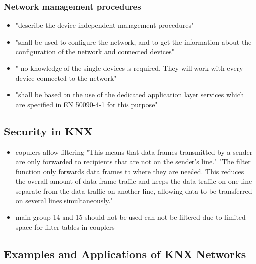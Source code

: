 \subsubsection{Network management procedures}
	\begin{itemize}
		\item "describe the device independent management procedures" \parencite{DIN_EN_50090-7-1}
		\item "shall be used to configure the network, and to get the information about the configuration of the network and connected devices" \parencite{DIN_EN_50090-7-1}
		\item " no knowledge of the single devices is required. They will work with every device connected to the network" \parencite{DIN_EN_50090-7-1}
		\item "shall be based on the use of the dedicated application layer services which are specified in EN 50090-4-1 \parencite{DIN_EN_50090-4-1} for this purpose" \parencite{DIN_EN_50090-7-1}
	\end{itemize}
	
\subsection{Security in KNX}
	\begin{itemize}
		\item copulers allow filtering 
			\subitem "This means that data frames transmitted by a sender are only forwarded to recipients that are not on the sender’s line." \parencite{Merz2009}
			\subitem "The filter function only forwards data frames to where they are needed. This reduces the overall amount of data frame traffic and keeps the data traffic on one line separate from the data traffic on another line, allowing data to be transferred on several lines simultaneously." \parencite{Merz2009}
		\item main group 14 and 15 should not be used \parencite{Hubner2009}
			\subitem can not be filtered due to limited space for filter tables in couplers \parencite{Hubner2009}
			
			
	\end{itemize}
	
\subsection{Examples and Applications of KNX Networks}

\section{\lonworks}

\section{\bacnet}